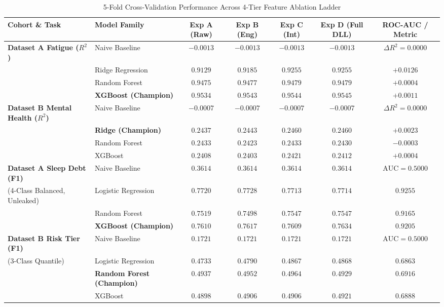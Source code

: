 \documentclass[10pt,twocolumn,a4paper]{article}
\begin{document}
\begin{table}[t]
\centering
\caption{5-Fold Cross-Validation Performance Across 4-Tier Feature Ablation Ladder}
\label{tab:ablation}
\small
\begin{tabular}{llccccc}
\toprule
\textbf{Cohort \& Task} & \textbf{Model Family} & \textbf{Exp A (Raw)} & \textbf{Exp B (Eng)} & \textbf{Exp C (Int)} & \textbf{Exp D (Full DLL)} & \textbf{ROC-AUC / Metric} \\
\midrule
\textbf{Dataset A Fatigue ($R^2$)} & Naive Baseline & $-0.0013$ & $-0.0013$ & $-0.0013$ & $-0.0013$ & $\Delta R^2 = 0.0000$ \\
& Ridge Regression & $0.9129$ & $0.9185$ & $0.9255$ & $0.9255$ & $+0.0126$ \\
& Random Forest & $0.9475$ & $0.9477$ & $0.9479$ & $0.9479$ & $+0.0004$ \\
& \textbf{XGBoost (Champion)} & $\mathbf{0.9534}$ & $\mathbf{0.9543}$ & $\mathbf{0.9544}$ & $\mathbf{0.9545}$ & $\mathbf{+0.0011}$ \\
\midrule
\textbf{Dataset B Mental Health ($R^2$)} & Naive Baseline & $-0.0007$ & $-0.0007$ & $-0.0007$ & $-0.0007$ & $\Delta R^2 = 0.0000$ \\
& \textbf{Ridge (Champion)} & $0.2437$ & $0.2443$ & $\mathbf{0.2460}$ & $\mathbf{0.2460}$ & $\mathbf{+0.0023}$ \\
& Random Forest & $0.2433$ & $0.2423$ & $0.2433$ & $0.2430$ & $-0.0003$ \\
& XGBoost & $0.2408$ & $0.2403$ & $0.2421$ & $0.2412$ & $+0.0004$ \\
\midrule
\textbf{Dataset A Sleep Debt (F1)} & Naive Baseline & $0.3614$ & $0.3614$ & $0.3614$ & $0.3614$ & $\text{AUC} = 0.5000$ \\
(4-Class Balanced, Unleaked) & Logistic Regression & $0.7720$ & $\mathbf{0.7728}$ & $0.7713$ & $0.7714$ & $\mathbf{0.9255}$ \\
& Random Forest & $0.7519$ & $0.7498$ & $0.7547$ & $0.7547$ & $0.9165$ \\
& \textbf{XGBoost (Champion)} & $0.7610$ & $0.7617$ & $0.7609$ & $\mathbf{0.7634}$ & $\mathbf{0.9205}$ \\
\midrule
\textbf{Dataset B Risk Tier (F1)} & Naive Baseline & $0.1721$ & $0.1721$ & $0.1721$ & $0.1721$ & $\text{AUC} = 0.5000$ \\
(3-Class Quantile) & Logistic Regression & $0.4733$ & $0.4790$ & $0.4867$ & $0.4868$ & $0.6863$ \\
& \textbf{Random Forest (Champion)} & $0.4937$ & $0.4952$ & $\mathbf{0.4964}$ & $0.4929$ & $\mathbf{0.6916}$ \\
& XGBoost & $0.4898$ & $0.4906$ & $0.4906$ & $0.4921$ & $0.6888$ \\
\bottomrule
\end{tabular}
\end{table}
\end{document}
